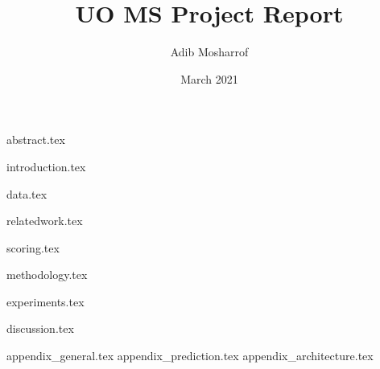 \documentclass{article}
\title{UO MS Project Report}
\author{Adib Mosharrof}
\date{March 2021}
\begin{document}
\let\oldequation=\equation
\let\endoldequation=\endequation
\renewenvironment{equation}{\vspace{2mm}\begin{oldequation}}{\end{oldequation}\vspace{2mm}}

\newenvironment{conditions}
  {\par\vspace{\abovedisplayskip}\noindent\begin{tabular}{>{$}r<{$} @{${}:{}$} l}}
  {\end{tabular}\par\vspace{\belowdisplayskip}}

\maketitle

\newpage
\tableofcontents
\newpage

{abstract.tex}

{introduction.tex}

{data.tex}

{relatedwork.tex}

{scoring.tex}

{methodology.tex}

{experiments.tex}

{discussion.tex}

\appendix

{appendix_general.tex}
{appendix_prediction.tex}
{appendix_architecture.tex}



\end{document}
